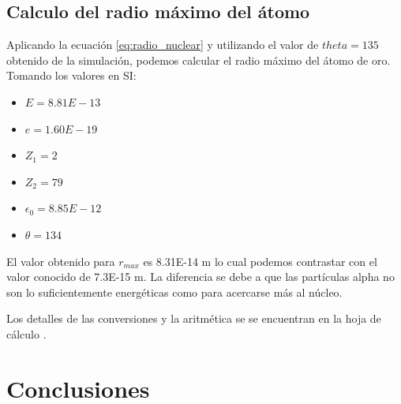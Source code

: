 \documentclass[twocolumn,a4paper,11pt]{scrartcl}
\begin{document}
\subsection*{Calculo del radio máximo del átomo}
Aplicando la ecuación \ref{eq:radio_nuclear} y utilizando el valor de $theta=135$ obtenido de la simulación, podemos calcular el radio máximo del átomo de oro.
Tomando los valores en SI:
\begin{itemize}
  \item $E=8.81E-13$
  \item $e=1.60E-19$
  \item $Z_1=2$
  \item $Z_2=79$
  \item $\epsilon_0=8.85E-12$
  \item $\theta = 134$
\end{itemize}

El valor obtenido para $r_{max}$ es 8.31E-14 m lo cual podemos contrastar con el valor conocido de 7.3E-15 m. La diferencia se debe a que las partículas alpha no son lo suficientemente energéticas como para acercarse más al núcleo.

Los detalles de las conversiones y la aritmética se se encuentran en la hoja de cálculo \cite{HojaCalculo}.


\section{Conclusiones}





\end{document}
